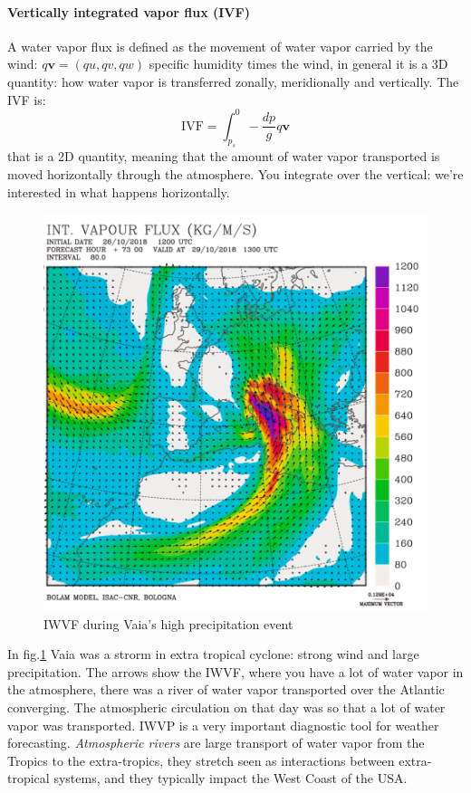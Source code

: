 \paragraph{Vertically integrated vapor flux (IVF)} A water vapor flux is defined as the movement of water vapor carried by the wind: $q\mathbf{v}=(qu,qv,qw)$ specific humidity times the wind, in general it is a 3D quantity: how water vapor is transferred zonally, meridionally and vertically. The IVF is:
\begin{equation}
    \text{IVF}=\int_{p_s}^0-\frac{dp}{g}q\mathbf{v}
\end{equation}
that is a 2D quantity, meaning that the amount of water vapor transported is moved horizontally through the atmosphere. You integrate over the vertical: we're interested in what happens horizontally.
\begin{figure}[h]
    \centering
    \includegraphics[width=0.5\linewidth]{uploads/VAIA.png}
    \caption{IWVF during Vaia’s high precipitation event }
    \label{fig:VAIA}
\end{figure}
In fig.\ref{fig:VAIA} Vaia was a strorm in extra tropical cyclone: strong wind and large precipitation. The arrows show the IWVF, where you have a lot of water vapor in the atmosphere, there was a river of water vapor transported over the Atlantic converging. The atmospheric circulation on that day was so that a lot of water vapor was transported. IWVP is a very important diagnostic tool for weather forecasting. \textit{Atmospheric rivers} are large transport of water vapor from the Tropics to the extra-tropics, they stretch seen as interactions between extra-tropical systems, and they typically impact the West Coast of the USA.

